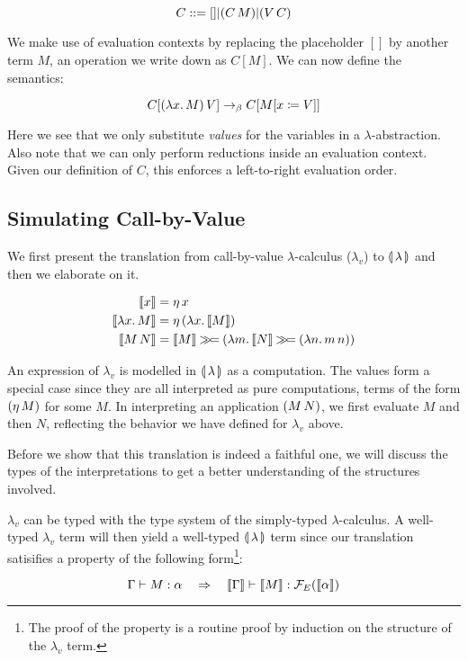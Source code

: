 $$
C ::= [] | (C\,M) | (V\,C)
$$

We make use of evaluation contexts by replacing the placeholder $[]$ by
another term $M$, an operation we write down as $C[M]$. We can now define
the semantics:

$$
C[(\lambda x.\, M)\,V] \to_\beta C[M[x \coloneqq V]]
$$

Here we see that we only substitute \emph{values} for the variables in a
$\lambda$-abstraction. Also note that we can only perform reductions inside
an evaluation context. Given our definition of $C$, this enforces a
left-to-right evaluation order.

\subsection{Simulating Call-by-Value}

We first present the translation from call-by-value $\lambda$-calculus
($\lambda_v$) to $\llparenthesis \, \lambda \, \rrparenthesis$ and then we elaborate on it.

\begin{align*}
  \llbracket x \rrbracket &= \eta\,x \\
  \llbracket \lambda x.\, M \rrbracket &= \eta\,(\lambda x.\, \llbracket M \rrbracket) \\
  \llbracket M\,N \rrbracket &= \llbracket M \rrbracket \mathbin{\gg\!=} (\lambda m.\, \llbracket N \rrbracket \mathbin{\gg\!=} (\lambda n.\, m\,n))
\end{align*}

An expression of $\lambda_v$ is modelled in $\llparenthesis \, \lambda \, \rrparenthesis$ as a
computation. The values form a special case since they are all interpreted
as pure computations, terms of the form $(\eta\,M)$ for some $M$. In
interpreting an application $(M\,N)$, we first evaluate $M$ and then
$N$, reflecting the behavior we have defined for $\lambda_v$ above.

Before we show that this translation is indeed a faithful one, we will
discuss the types of the interpretations to get a better understanding of
the structures involved.

$\lambda_v$ can be typed with the type system of the simply-typed
$\lambda$-calculus. A well-typed $\lambda_v$ term will then yield a
well-typed $\llparenthesis \, \lambda \, \rrparenthesis$ term since our translation satisifies a
property of the following form\footnote{The proof of the property is a
  routine proof by induction on the structure of the $\lambda_v$ term.}:

$$
\Gamma \vdash M : \alpha
\quad \Rightarrow \quad
\llbracket \Gamma \rrbracket \vdash \llbracket M \rrbracket : \mathcal{F}_E(\llbracket \alpha \rrbracket)
$$

